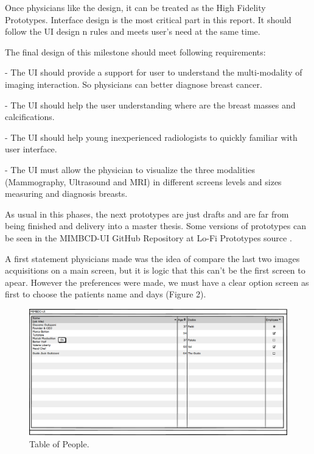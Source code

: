 Once physicians like the design, it can be treated as the High Fidelity Prototypes. Interface design is the most critical part in this report. It should follow the UI design n rules and meets user’s need at the same time.

The final design of this milestone should meet following requirements:

- The UI should provide a support for user to understand the multi-modality of imaging interaction. So physicians can better diagnose breast cancer.

- The UI should help the user understanding where are the breast masses and calcifications.

- The UI should help young inexperienced radiologists to quickly familiar with
user interface.

- The UI must allow the physician to visualize the three modalities (Mammography, Ultrasound and MRI) in different screens levels and sizes measuring and diagnosis breasts.

As usual in this phases, the next prototypes are just drafts and are far from being finished and delivery into a master thesis. Some versions of prototypes can be seen in the MIMBCD-UI GitHub Repository at Lo-Fi Prototypes source \cite{mimbcdUILoFiPrototypes}.

\clearpage

A first statement physicians made was the idea of compare the last two images acquisitions on a main screen, but it is logic that this can't be the first screen to apear. However the preferences were made, we must have a clear option screen as first to choose the patients name and days (Figure 2).

\begin{figure}[!hbt]
\centering
\includegraphics[width=1.00\textwidth]{tabela_pessoas.png}
\caption{\label{PT}Table of People.
}
\end{figure}

